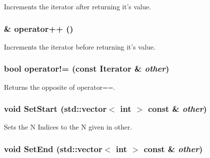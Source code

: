 Increments the iterator after returning it's value. \hypertarget{classJKBuilder_1_1Iterator_ae1f21c74128a5ef5d1b9de72ceb09be8}{
\subsubsection[{operator++}]{ \& operator++ ()}}
\label{classJKBuilder_1_1Iterator_ae1f21c74128a5ef5d1b9de72ceb09be8}


Increments the iterator before returning it's value. \hypertarget{classJKBuilder_1_1Iterator_a8c06af8ae0d9d1614ae9f81629275926}{
\subsubsection[{operator!=}]{\setlength{\rightskip}{0pt plus 5cm}bool operator!= (const {\bf Iterator} \& {\em other})}}
\label{classJKBuilder_1_1Iterator_a8c06af8ae0d9d1614ae9f81629275926}


Returns the opposite of operator==. \hypertarget{classJKBuilder_1_1Iterator_aa83de505e29125c1d3ac7bb1b13ca15a}{
\subsubsection[{SetStart}]{\setlength{\rightskip}{0pt plus 5cm}void SetStart (std::vector$<$ int $>$ const \& {\em other})}}
\label{classJKBuilder_1_1Iterator_aa83de505e29125c1d3ac7bb1b13ca15a}


Sets the N Indices to the N given in other. \hypertarget{classJKBuilder_1_1Iterator_aad84ec668b5f41210db34c540aaa31fc}{
\subsubsection[{SetEnd}]{\setlength{\rightskip}{0pt plus 5cm}void SetEnd (std::vector$<$ int $>$ const \& {\em other})}}
\label{classJKBuilder_1_1Iterator_aad84ec668b5f41210db34c540aaa31fc}


